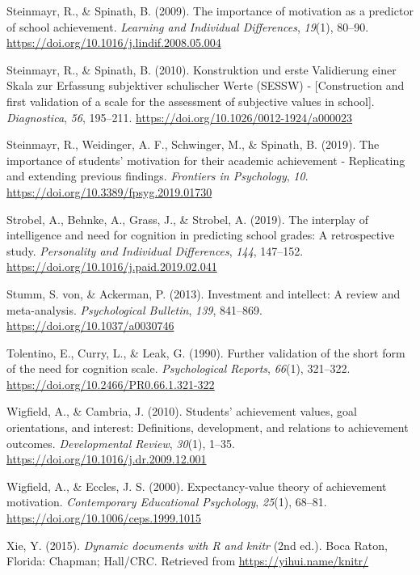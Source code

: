 \documentclass[
  man]{apa6}
\newlength{\cslhangindent}
\newlength{\cslentryspacingunit} %
\newenvironment{CSLReferences}[2] %
 {%
  \setlength{\parindent}{0pt}
  \ifodd #1
  \let\oldpar\par
  \def\par{\hangindent=\cslhangindent\oldpar}
  \fi
  \setlength{\parskip}{#2\cslentryspacingunit}
 }%
 {}
\begin{document}
\begin{CSLReferences}{1}{0}
\leavevmode{}%
Steinmayr, R., \& Spinath, B. (2009). The importance of motivation as a predictor of school achievement. \emph{Learning and Individual Differences}, \emph{19}(1), 80--90. \url{https://doi.org/10.1016/j.lindif.2008.05.004}

\leavevmode{}%
Steinmayr, R., \& Spinath, B. (2010). {Konstruktion und erste Validierung einer Skala zur Erfassung subjektiver schulischer Werte (SESSW) - {[}Construction and first validation of a scale for the assessment of subjective values in school{]}}. \emph{Diagnostica}, \emph{56}, 195--211. \url{https://doi.org/10.1026/0012-1924/a000023}

\leavevmode{}%
Steinmayr, R., Weidinger, A. F., Schwinger, M., \& Spinath, B. (2019). The importance of students' motivation for their academic achievement - {R}eplicating and extending previous findings. \emph{Frontiers in Psychology}, \emph{10}. \url{https://doi.org/10.3389/fpsyg.2019.01730}

\leavevmode{}%
Strobel, A., Behnke, A., Grass, J., \& Strobel, A. (2019). The interplay of intelligence and need for cognition in predicting school grades: A retrospective study. \emph{Personality and Individual Differences}, \emph{144}, 147--152. \url{https://doi.org/10.1016/j.paid.2019.02.041}

\leavevmode{}%
Stumm, S. von, \& Ackerman, P. (2013). Investment and intellect: A review and meta-analysis. \emph{Psychological Bulletin}, \emph{139}, 841--869. \url{https://doi.org/10.1037/a0030746}

\leavevmode{}%
Tolentino, E., Curry, L., \& Leak, G. (1990). Further validation of the short form of the need for cognition scale. \emph{Psychological Reports}, \emph{66}(1), 321--322. \url{https://doi.org/10.2466/PR0.66.1.321-322}

\leavevmode{}%
Wigfield, A., \& Cambria, J. (2010). Students' achievement values, goal orientations, and interest: Definitions, development, and relations to achievement outcomes. \emph{Developmental Review}, \emph{30}(1), 1--35. \url{https://doi.org/10.1016/j.dr.2009.12.001}

\leavevmode{}%
Wigfield, A., \& Eccles, J. S. (2000). Expectancy-value theory of achievement motivation. \emph{Contemporary Educational Psychology}, \emph{25}(1), 68--81. \url{https://doi.org/10.1006/ceps.1999.1015}

\leavevmode{}%
Xie, Y. (2015). \emph{Dynamic documents with {R} and knitr} (2nd ed.). Boca Raton, Florida: Chapman; Hall/CRC. Retrieved from \url{https://yihui.name/knitr/}

\end{CSLReferences}

\endgroup

\newpage
\end{document}

